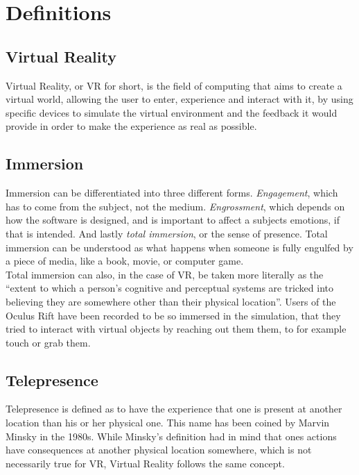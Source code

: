 \documentclass[11pt]{article}
\begin{document}
	\section{Definitions}
		\subsection{Virtual Reality}
			Virtual Reality, or VR for short, is the field of computing that aims to create a virtual world, allowing the user to enter, experience and interact with it, by using specific devices to simulate the virtual environment and the feedback it would provide in order to make the experience as real as possible.
			\cite{boas13}
			
		\subsection{Immersion}
			Immersion can be differentiated into three different forms. \textit{Engagement}, which has to come from the subject, not the medium. \textit{Engrossment}, which depends on how the software is designed, and is important to affect a subjects emotions, if that is intended. And lastly \textit{total immersion}, or the sense of presence. Total immersion can be understood as what happens when someone is fully engulfed by a piece of media, like a book, movie, or computer game. \cite{Brown:2004:GIG:985921.986048} \\
			Total immersion can also, in the case of VR, be taken more literally as the “extent to which a person's cognitive and perceptual systems are tricked into believing they are somewhere other than their physical location”. \cite{Patrick:2000:ULP:332040.332479} Users of the Oculus Rift have been recorded to be so immersed in the simulation, that they tried to interact with virtual objects by reaching out them them, to for example touch or grab them. \cite{bastiaens14}

		\subsection{Telepresence}
			Telepresence is defined as to have the experience that one is present at another location than his or her physical one.  This name has been coined by Marvin Minsky in the 1980s. \cite{minsky1980telepresence} While Minsky's definition had in mind that ones actions have consequences at another physical location somewhere, which is not necessarily true for VR, Virtual Reality follows the same concept.
			
\end{document}
